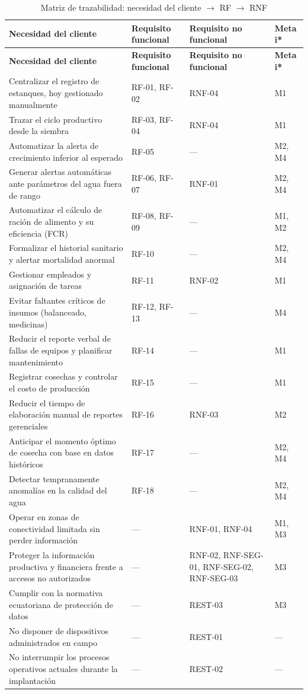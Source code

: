 \documentclass[12pt,a4paper]{article}
\begin{document}
\begin{longtable}{|p{4.6cm}|p{3.6cm}|p{3.4cm}|p{2.0cm}|}
\caption{Matriz de trazabilidad: necesidad del cliente $\rightarrow$ RF $\rightarrow$ RNF} \\
\hline
\textbf{Necesidad del cliente} & \textbf{Requisito funcional} & \textbf{Requisito no funcional} & \textbf{Meta i*} \\
\hline
\endfirsthead
\hline
\textbf{Necesidad del cliente} & \textbf{Requisito funcional} & \textbf{Requisito no funcional} & \textbf{Meta i*} \\
\hline
\endhead
Centralizar el registro de estanques, hoy gestionado manualmente & RF-01, RF-02 & RNF-04 & M1 \\ \hline
Trazar el ciclo productivo desde la siembra & RF-03, RF-04 & RNF-04 & M1 \\ \hline
Automatizar la alerta de crecimiento inferior al esperado & RF-05 & --- & M2, M4 \\ \hline
Generar alertas automáticas ante parámetros del agua fuera de rango & RF-06, RF-07 & RNF-01 & M2, M4 \\ \hline
Automatizar el cálculo de ración de alimento y su eficiencia (FCR) & RF-08, RF-09 & --- & M1, M2 \\ \hline
Formalizar el historial sanitario y alertar mortalidad anormal & RF-10 & --- & M2, M4 \\ \hline
Gestionar empleados y asignación de tareas & RF-11 & RNF-02 & M1 \\ \hline
Evitar faltantes críticos de insumos (balanceado, medicinas) & RF-12, RF-13 & --- & M4 \\ \hline
Reducir el reporte verbal de fallas de equipos y planificar mantenimiento & RF-14 & --- & M1 \\ \hline
Registrar cosechas y controlar el costo de producción & RF-15 & --- & M1 \\ \hline
Reducir el tiempo de elaboración manual de reportes gerenciales & RF-16 & RNF-03 & M2 \\ \hline
Anticipar el momento óptimo de cosecha con base en datos históricos & RF-17 & --- & M2, M4 \\ \hline
Detectar tempranamente anomalías en la calidad del agua & RF-18 & --- & M2, M4 \\ \hline
Operar en zonas de conectividad limitada sin perder información & --- & RNF-01, RNF-04 & M1, M3 \\ \hline
Proteger la información productiva y financiera frente a accesos no
autorizados & --- & RNF-02, RNF-SEG-01, RNF-SEG-02, RNF-SEG-03 & M3 \\ \hline
Cumplir con la normativa ecuatoriana de protección de datos & --- & REST-03 & M3 \\ \hline
No disponer de dispositivos administrados en campo & --- & REST-01 & --- \\ \hline
No interrumpir los procesos operativos actuales durante la implantación & --- & REST-02 & --- \\ \hline
\end{longtable}
\end{document}
